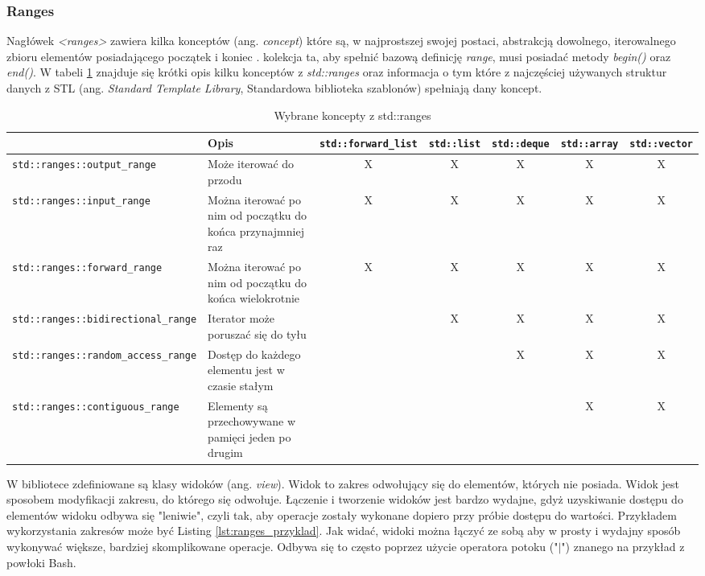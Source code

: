 \documentclass[a4paper,12pt]{book} %
\begin{document}
\subsubsection{Ranges}
Nagłówek \emph{<ranges>} zawiera kilka konceptów (ang. \emph{concept}) które są, w najprostszej swojej postaci, abstrakcją dowolnego, iterowalnego zbioru elementów posiadającego początek i koniec \cite{ranges}. kolekcja ta, aby spełnić bazową definicję \emph{range}, musi posiadać metody \emph{begin()} oraz \emph{end()}. W tabeli \ref{ranges_concepts} znajduje się krótki opis kilku konceptów z \emph{std::ranges} oraz informacja o tym które z najczęściej używanych struktur danych z STL (ang. \emph{Standard Template Library}, Standardowa biblioteka szablonów) spełniają dany koncept.
\begin{table}[H]
\begin{adjustbox}{max width=\textheight, angle=90, center}
\begin{tabular}{|l|m{7cm}|ccccc|}
\hline
	& Opis & \texttt{std::forward\_list} & \texttt{std::list} & \texttt{std::deque} & \texttt{std::array} & \texttt{std::vector} \\
\hline
\texttt{std::ranges::output\_range} & Może iterować do przodu & X & X & X & X & X \\
\hline
\texttt{std::ranges::input\_range} & Można iterować po nim od początku do końca przynajmniej raz & X & X & X & X & X \\
\hline
\texttt{std::ranges::forward\_range} & Można iterować po nim od początku do końca wielokrotnie & X & X & X & X & X \\
\hline
\texttt{std::ranges::bidirectional\_range} & Iterator może poruszać się do tyłu & & X & X & X & X \\
\hline
\texttt{std::ranges::random\_access\_range} & Dostęp do każdego elementu jest w czasie stałym & & & X & X & X \\
\hline
\texttt{std::ranges::contiguous\_range} & Elementy są przechowywane w pamięci jeden po drugim & & & & X & X \\
\hline
\end{tabular}
\end{adjustbox}
\caption{Wybrane koncepty z std::ranges}
\label{ranges_concepts}
\end{table}
W bibliotece zdefiniowane są klasy widoków (ang. \emph{view}). Widok to zakres odwołujący się do elementów, których nie posiada. Widok jest sposobem modyfikacji zakresu, do którego się odwołuje. Łączenie i tworzenie widoków jest bardzo wydajne, gdyż uzyskiwanie dostępu do elementów widoku odbywa się "leniwie", czyli tak, aby operacje zostały wykonane dopiero przy próbie dostępu do wartości. Przykładem wykorzystania zakresów może być Listing \ref{lst:ranges_przyklad}. Jak widać, widoki można łączyć ze sobą aby w prosty i wydajny sposób wykonywać większe, bardziej skomplikowane operacje. Odbywa się to często poprzez użycie operatora potoku ("$|$") znanego na przykład z powłoki Bash.
\end{document}
